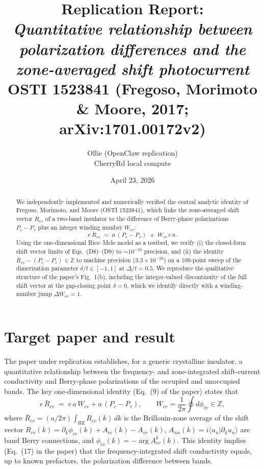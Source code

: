 \documentclass[11pt]{article}
\title{Replication Report: \\
\emph{Quantitative relationship between polarization differences and
the zone-averaged shift photocurrent} \\
\normalsize OSTI 1523841 \; (Fregoso, Morimoto \& Moore, 2017; arXiv:1701.00172v2)}
\author{Ollie (OpenClaw replication)\\ \small CherryRd local compute}
\date{April 23, 2026}
\begin{document}
\maketitle

\begin{abstract}
We independently implemented and numerically verified the central
analytic identity of Fregoso, Morimoto, and Moore (OSTI 1523841),
which links the zone-averaged shift vector
$\bar{R}_{cv}$ of a two-band insulator to the difference of
Berry-phase polarizations $P_c - P_v$ plus an integer winding number
$W_{cv}$:
\[
  e\,\bar{R}_{cv} \;=\; a\,(P_c - P_v) \;+\; W_{cv}\,e\,a.
\]
Using the one-dimensional Rice--Mele model as a testbed, we verify
(i) the closed-form shift vector limits of Eqs.~(D8)--(D9) to
$\sim\!10^{-16}$ precision, and (ii) the identity
$\bar{R}_{cv}-(P_c-P_v)\in\mathbb{Z}$ to machine precision
($3.3\times 10^{-16}$) on a 100-point sweep of the dimerization
parameter $\delta/t\in[-1,1]$ at $\Delta/t=0.5$. We reproduce the
qualitative structure of the paper's Fig.~1(b), including the
integer-valued discontinuity of the full shift vector at the
gap-closing point $\delta=0$, which we identify directly with a
winding-number jump $\Delta W_{cv} = 1$.
\end{abstract}

\section{Target paper and result}

The paper under replication establishes, for a generic crystalline
insulator, a quantitative relationship between the frequency- and
zone-integrated shift-current conductivity and Berry-phase
polarizations of the occupied and unoccupied bands. The key
one-dimensional identity (Eq.~(9) of the paper) states that
\begin{equation}
  e\,\bar{R}_{cv}
  \;=\;
  e\,a\,W_{cv} + a\,(P_c - P_v),
  \qquad
  W_{cv} = \frac{1}{2\pi}\oint d\phi_{cv}\in\mathbb{Z},
  \label{eq:identity}
\end{equation}
where $\bar{R}_{cv} = (a/2\pi)\int_{\text{BZ}}R_{cv}(k)\,dk$ is the
Brillouin-zone average of the shift vector
$R_{cv}(k) = \partial_k\phi_{cv}(k) + A_{cc}(k) - A_{vv}(k)$,
$A_{nn}(k) = i\langle u_n|\partial_k u_n\rangle$ are band Berry
connections, and $\phi_{cv}(k) = -\arg A_{cv}^{k}(k)$. This identity
implies (Eq.~(17) in the paper) that the frequency-integrated shift
conductivity equals, up to known prefactors, the polarization
difference between bands.
\end{document}
